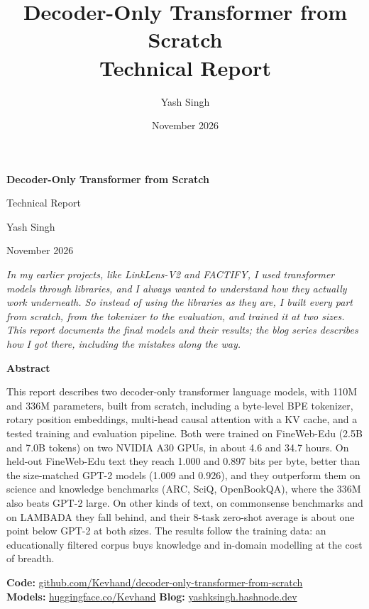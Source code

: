 \documentclass[11pt]{article}
\title{\textbf{Decoder-Only Transformer from Scratch}\\[0.3em]\large Technical Report}
\author{Yash Singh}
\date{November 2026}
\begin{document}
\begin{titlepage}
\centering
\vspace*{2.2cm}
{\LARGE\bfseries Decoder-Only Transformer from Scratch\par}
\vspace{0.4cm}
{\large Technical Report\par}
\vspace{1.2cm}
{\large Yash Singh\par}
\vspace{0.3cm}
{November 2026\par}
\vspace{1.4cm}
\begin{minipage}{0.84\linewidth}
\itshape In my earlier projects, like LinkLens-V2 and FACTIFY, I used transformer models through libraries, and I always wanted to understand how they actually work underneath. So instead of using the libraries as they are, I built every part from scratch, from the tokenizer to the evaluation, and trained it at two sizes. This report documents the final models and their results; the blog series describes how I got there, including the mistakes along the way.
\end{minipage}
\vspace{1.2cm}

{\bfseries Abstract\par}
\vspace{0.3cm}
\begin{minipage}{0.84\linewidth}
\small\justifying\noindent
This report describes two decoder-only transformer language models, with 110M and 336M parameters, built from scratch, including a byte-level BPE tokenizer, rotary position embeddings, multi-head causal attention with a KV cache, and a tested training and evaluation pipeline. Both were trained on FineWeb-Edu (2.5B and 7.0B tokens) on two NVIDIA A30 GPUs, in about 4.6 and 34.7 hours. On held-out FineWeb-Edu text they reach 1.000 and 0.897 bits per byte, better than the size-matched GPT-2 models (1.009 and 0.926), and they outperform them on science and knowledge benchmarks (ARC, SciQ, OpenBookQA), where the 336M also beats GPT-2 large. On other kinds of text, on commonsense benchmarks and on LAMBADA they fall behind, and their 8-task zero-shot average is about one point below GPT-2 at both sizes. The results follow the training data: an educationally filtered corpus buys knowledge and in-domain modelling at the cost of breadth.
\end{minipage}

\vfill
{\small
\textbf{Code:} \href{https://github.com/Kevhand/decoder-only-transformer-from-scratch}{github.com/Kevhand/decoder-only-transformer-from-scratch}\\[0.25em]
\textbf{Models:} \href{https://huggingface.co/Kevhand}{huggingface.co/Kevhand}
\quad\textperiodcentered\quad
\textbf{Blog:} \href{https://yashksingh.hashnode.dev/}{yashksingh.hashnode.dev}\par}
\vspace{0.6cm}
\end{titlepage}
\end{document}
